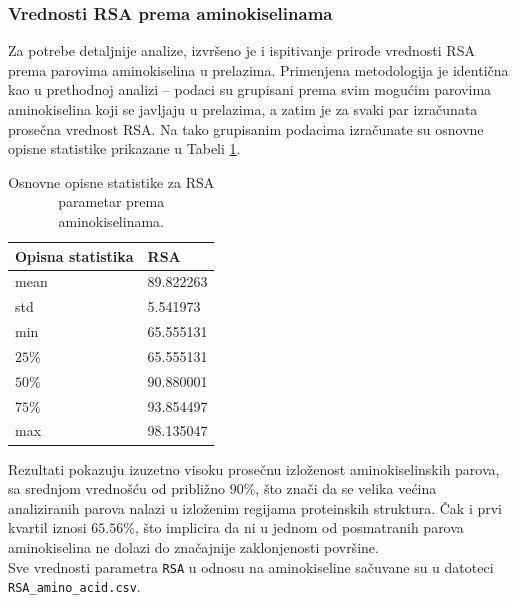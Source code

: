 \documentclass[a4paper,12pt]{article}
\begin{document}
\subsubsection{Vrednosti RSA prema aminokiselinama}
Za potrebe detaljnije analize, izvršeno je i ispitivanje prirode vrednosti RSA prema parovima aminokiselina u prelazima. Primenjena metodologija je identična kao u prethodnoj analizi – podaci su grupisani prema svim mogućim parovima aminokiselina koji se javljaju u prelazima, a zatim je za svaki par izračunata prosečna vrednost RSA. Na tako grupisanim podacima izračunate su osnovne opisne statistike prikazane u Tabeli \ref{Tabela:11}.
\begin{table}[h!]
    \centering
    \begin{tabular}{ |l|l| } 
    \hline
    \textbf{Opisna statistika} & \textbf{RSA} \\
    \hline
    mean & 89.822263 \\
    std  & 5.541973 \\
    min  & 65.555131 \\
    $25\%$  & 65.555131 \\
    $50\%$  & 90.880001 	\\
    $75\%$ & 93.854497\\
    max & 98.135047 	\\
    \hline
    \end{tabular}
    \caption{Osnovne opisne statistike za RSA parametar prema aminokiselinama.}
    \label{Tabela:11}
\end{table}

Rezultati pokazuju izuzetno visoku prosečnu izloženost aminokiselinskih parova, sa srednjom vrednošću od približno $90\%$, što znači da se velika većina analiziranih parova nalazi u izloženim regijama proteinskih struktura. Čak i prvi kvartil iznosi $65.56\%$, što implicira da ni u jednom od posmatranih parova aminokiselina ne dolazi do značajnije zaklonjenosti površine.\\
Sve vrednosti parametra \texttt{RSA} u odnosu na aminokiseline sačuvane su u datoteci \texttt{RSA\_amino\_acid.csv}.
\end{document}
